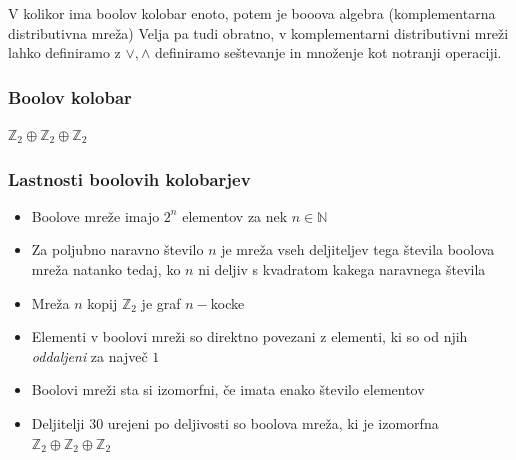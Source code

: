 \documentclass{beamer}
\begin{document}
\begin{frame}
\begin{block}
V kolikor ima boolov kolobar enoto, potem je booova algebra (komplementarna distributivna mreža)
Velja pa tudi obratno, v komplementarni distributivni mreži lahko definiramo z $\lor, \land$ definiramo seštevanje in množenje kot notranji operaciji.
\end{block}
\end{frame}

\begin{frame}
\frametitle{Boolov kolobar}
\begin{center}
$\mathbb{Z}_2 \oplus \mathbb{Z}_2 \oplus \mathbb{Z}_2$
\end{center}
\begin{figure}
\centering
{}
\end{figure}
\end{frame}

\begin{frame}
\frametitle{Lastnosti boolovih kolobarjev}
\begin{block}{}
\begin{itemize}
\item Boolove mreže imajo $2^n$ elementov za nek $n \in \mathbb{N}$
\item Za poljubno naravno število $n$ je mreža vseh deljiteljev tega števila boolova mreža natanko tedaj, ko $n$ ni deljiv s kvadratom kakega naravnega števila\\
\item Mreža $n$ kopij $\mathbb{Z}_2$ je graf $n-$kocke
\item Elementi v boolovi mreži so direktno povezani z elementi, ki so od njih \textit{oddaljeni} za največ $1$
\item Boolovi mreži sta si izomorfni, če imata enako število elementov
\item Deljitelji $30$ urejeni po deljivosti so boolova mreža, ki je izomorfna $\mathbb{Z}_2 \oplus \mathbb{Z}_2 \oplus \mathbb{Z}_2$
\end{itemize}

\end{block}
\end{frame}
\end{document}
